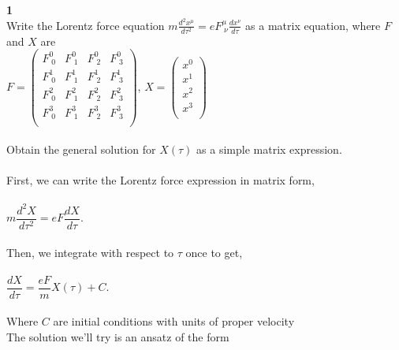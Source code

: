 \documentclass[prb,preprint]
{revtex4-1}
\begin{document}
\textbf{1}
\\
Write the Lorentz force equation $m \frac{d^2 x^\mu}{d\tau^2} = e F^\mu_{\;\nu} \frac{d x^\nu}{d\tau}$ as a matrix equation, where $F$ and $X$ are 
\\
$F = \begin{pmatrix}
F^0_{\;0} & F^0_{\;1} & F^0_{\;2} & F^0_{\;3}\\
F^1_{\;0} & F^1_{\;1} & F^1_{\;2} & F^1_{\;3}\\
F^2_{\;0} & F^2_{\;1} & F^2_{\;2} & F^2_{\;3}\\
F^3_{\;0} & F^3_{\;1} & F^3_{\;2} & F^3_{\;3}\\
\end{pmatrix} $, 
$X = \begin{pmatrix}
x^0\\
x^1\\
x^2\\
x^3\\
\end{pmatrix} $
\\
\\
Obtain the general solution for $X\left(\tau\right)$ as a simple matrix expression.
\\
\\
First, we can write the Lorentz force expression in matrix form,
\\
\\
$m \dfrac{d^2 X}{d\tau^2} = e F \dfrac{dX}{d\tau}$.
\\
\\
Then, we integrate with respect to $\tau$ once to get,
\\
\\
$\dfrac{d X}{d\tau} = \dfrac{e F}{m} X\left(\tau\right) + C$.
\\
\\
Where $C$ are initial conditions with units of proper velocity
\\
The solution we'll try is an ansatz of the form 
\end{document}
